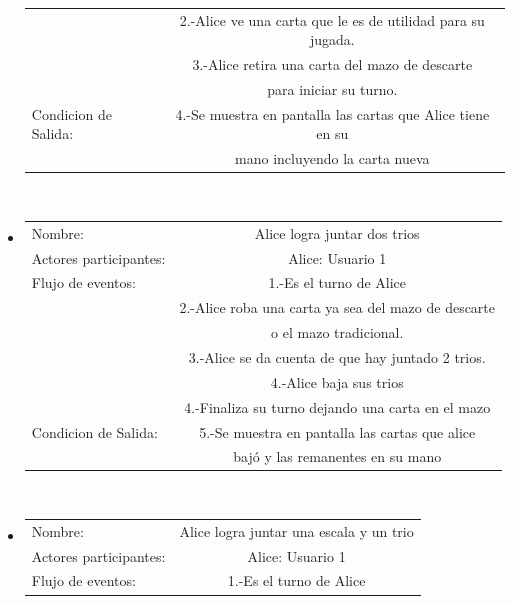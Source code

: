 \begin{itemize}
\begin{tabular}{ l | c  }
                                        & 2.-Alice ve una carta que le es de utilidad para su jugada. \\
                                        & 3.-Alice retira una carta del mazo de descarte\\ & para iniciar su turno. \\\hline
        Condicion de Salida:            & 4.-Se muestra en pantalla las cartas que Alice tiene en su\\
                                        &mano incluyendo la carta nueva\\
    \end{tabular}
    \\
\item
    \begin{tabular}{ l | c  }
        Nombre:                      & Alice logra juntar dos trios \\
        Actores participantes:          & Alice: Usuario  1                                              \\\hline
        Flujo de eventos:               & 1.-Es el turno de Alice                                 \\
                                        & 2.-Alice roba una carta ya sea del mazo de descarte \\ & o el mazo tradicional.\\
                                        & 3.-Alice se da cuenta de que hay juntado 2 trios. \\
                                        & 4.-Alice baja sus trios                      \\
                                        & 4.-Finaliza su turno dejando una carta en el mazo             \\\hline
        Condicion de Salida:            & 5.-Se muestra en pantalla las cartas que alice \\ & bajó y las remanentes en su mano 
                                            \\\hline
    \end{tabular}
    \\
\item
    \begin{tabular}{ l | c  }
        Nombre:            & Alice logra juntar una escala y un trio\\
        Actores participantes: & Alice: Usuario  1                                              \\\hline
        Flujo de eventos:               & 1.-Es el turno de Alice                                 \\

\end{tabular}
\end{itemize}
